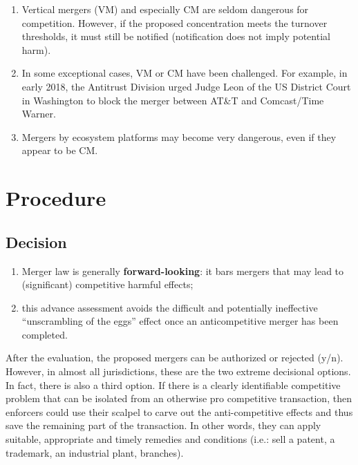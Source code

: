         \begin{enumerate}
            \item Vertical mergers (VM) and especially CM are seldom dangerous for competition. However, if the proposed concentration meets the turnover thresholds, it must still be notified (notification does not imply potential harm).
        
            \item In some exceptional cases, VM or CM have been challenged. For example, in early 2018, the Antitrust Division urged Judge Leon of the US District Court in Washington to block the merger between AT\&T and Comcast/Time Warner.
        
            \item Mergers by ecosystem platforms may become very dangerous, even if they appear to be CM.
        \end{enumerate}

\section{Procedure}

    \subsection{Decision}

        \begin{enumerate}
            \item Merger law is generally \textbf{forward-looking}: it bars mergers that may lead to (significant) competitive harmful effects;
            \item this advance assessment avoids the difficult and potentially ineffective “unscrambling of the eggs” effect once an anticompetitive merger has been completed.
        \end{enumerate}

        After the evaluation, the proposed mergers can be authorized or rejected (y/n). However, in almost all jurisdictions, these are the two extreme decisional options. In fact, there is also a third option. If there is a clearly identifiable competitive problem that can be isolated from an otherwise pro competitive transaction, then enforcers could use their scalpel to carve out the anti-competitive effects and thus save the remaining part of the transaction. 
        In other words, they can apply suitable, appropriate and timely remedies and conditions (i.e.: sell a patent, a trademark, an industrial plant, branches).

